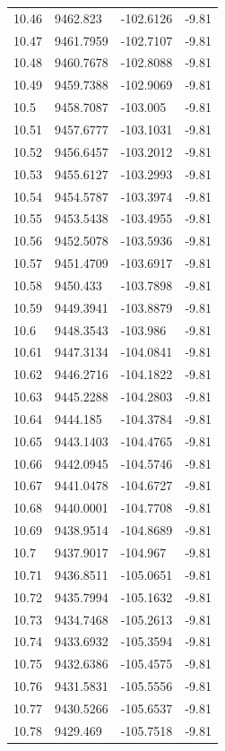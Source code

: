 \begin{table}[H]
\begin{tabular}{llll}
10.46 & 9462.823 & -102.6126 & -9.81 \\
10.47 & 9461.7959 & -102.7107 & -9.81 \\
10.48 & 9460.7678 & -102.8088 & -9.81 \\
10.49 & 9459.7388 & -102.9069 & -9.81 \\
10.5 & 9458.7087 & -103.005 & -9.81 \\
10.51 & 9457.6777 & -103.1031 & -9.81 \\
10.52 & 9456.6457 & -103.2012 & -9.81 \\
10.53 & 9455.6127 & -103.2993 & -9.81 \\
10.54 & 9454.5787 & -103.3974 & -9.81 \\
10.55 & 9453.5438 & -103.4955 & -9.81 \\
10.56 & 9452.5078 & -103.5936 & -9.81 \\
10.57 & 9451.4709 & -103.6917 & -9.81 \\
10.58 & 9450.433 & -103.7898 & -9.81 \\
10.59 & 9449.3941 & -103.8879 & -9.81 \\
10.6 & 9448.3543 & -103.986 & -9.81 \\
10.61 & 9447.3134 & -104.0841 & -9.81 \\
10.62 & 9446.2716 & -104.1822 & -9.81 \\
10.63 & 9445.2288 & -104.2803 & -9.81 \\
10.64 & 9444.185 & -104.3784 & -9.81 \\
10.65 & 9443.1403 & -104.4765 & -9.81 \\
10.66 & 9442.0945 & -104.5746 & -9.81 \\
10.67 & 9441.0478 & -104.6727 & -9.81 \\
10.68 & 9440.0001 & -104.7708 & -9.81 \\
10.69 & 9438.9514 & -104.8689 & -9.81 \\
10.7 & 9437.9017 & -104.967 & -9.81 \\
10.71 & 9436.8511 & -105.0651 & -9.81 \\
10.72 & 9435.7994 & -105.1632 & -9.81 \\
10.73 & 9434.7468 & -105.2613 & -9.81 \\
10.74 & 9433.6932 & -105.3594 & -9.81 \\
10.75 & 9432.6386 & -105.4575 & -9.81 \\
10.76 & 9431.5831 & -105.5556 & -9.81 \\
10.77 & 9430.5266 & -105.6537 & -9.81 \\
10.78 & 9429.469 & -105.7518 & -9.81 \\

\end{tabular}
\end{table}

